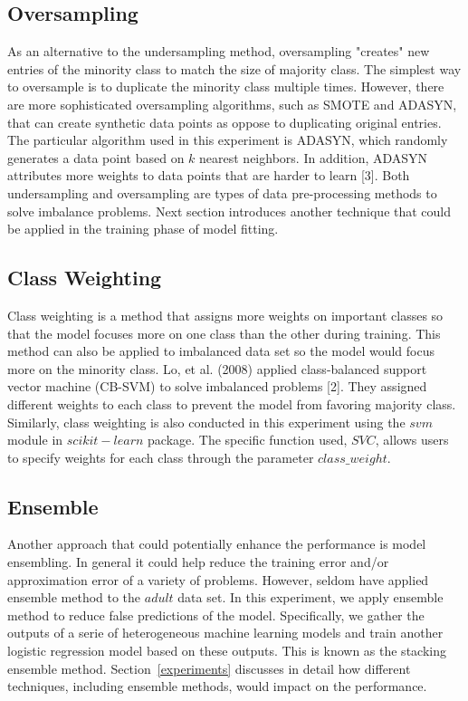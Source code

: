 \documentclass{article}
\begin{document}
\subsection{Oversampling}
\label{oversampling}

As an alternative to the undersampling method, oversampling "creates" new entries of the minority class to match the size of majority class. The simplest way to oversample is to duplicate the minority class multiple times. However, there are more sophisticated oversampling algorithms, such as SMOTE and ADASYN, that can create synthetic data points as oppose to duplicating original entries. The particular algorithm used in this experiment is ADASYN, which randomly generates a data point based on $k$ nearest neighbors. In addition, ADASYN attributes more weights to data points that are harder to learn [3]. Both undersampling and oversampling are types of data pre-processing methods to solve imbalance problems. Next section introduces another technique that could be applied in the training phase of model fitting.

\subsection{Class Weighting}
\label{class_weighting}

Class weighting is a method that assigns more weights on important classes so that the model focuses more on one class than the other during training. This method can also be applied to imbalanced data set so the model would focus more on the minority class. Lo, et al. (2008) applied class-balanced support vector machine (CB-SVM) to solve imbalanced problems [2]. They assigned different weights to each class to prevent the model from favoring majority class. Similarly, class weighting is also conducted in this experiment using the $svm$ module in $scikit-learn$ package. The specific function used, $SVC$, allows users to specify weights for each class through the parameter $class\_weight$.

\subsection{Ensemble}
\label{ensemble}

Another approach that could potentially enhance the performance is model ensembling. In general it could help reduce the training error and/or approximation error of a variety of problems. However, seldom have applied ensemble method to the $adult$ data set. In this experiment, we apply ensemble method to reduce false predictions of the model. Specifically, we gather the outputs of a serie of heterogeneous machine learning models and train another logistic regression model based on these outputs. This is known as the stacking ensemble method. Section~\ref{experiments} discusses in detail how different techniques, including ensemble methods, would impact on the performance.
\end{document}
